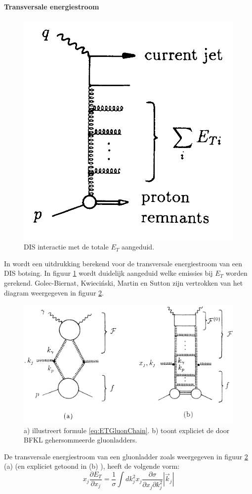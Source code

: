\documentclass[a4paper,11pt]{article}
\numberwithin{equation}{section} %
\begin{document}
      \paragraph{Transversale energiestroom}
\begin{figure} [H]
  \begin{center}
    \includegraphics[width=.33\textwidth]{Afbeeldingen/ETDefinitionDiagram.png}
    \caption{DIS interactie met de totale $E_T$ aangeduid. \cite{ET}}
   \label{fig:ETDefinitionDiagram}
  \end{center}
\end{figure}
In \cite{ET} wordt een uitdrukking berekend voor de transversale energiestroom van een DIS botsing.
In figuur \ref{fig:ETDefinitionDiagram} wordt duidelijk aangeduid welke emissies bij $E_T$ worden gerekend.
Golec-Biernat, Kwieciński, Martin en Sutton zijn vertrokken van het diagram weergegeven in figuur \ref{fig:ETDiagram}.
\begin{figure} [H]
  \begin{center}
    \includegraphics[width=.66\textwidth]{Afbeeldingen/ETDiagram.png}
    \caption{a) illustreert formule \eqref{eq:ETGluonChain}. b) toont expliciet de door BFKL gehersommeerde gluonladders. \cite{ET}}
   \label{fig:ETDiagram}
  \end{center}
\end{figure}
De transversale energiestroom van een gluonladder zoals weergegeven in figuur \ref{fig:ETDiagram} (a) (en expliciet getoond in (b) ), heeft de volgende vorm:
\begin{equation} \label{eq:ETGluonChain}
x_j \frac{\partial E_T}{\partial x_j} = \frac{1}{\sigma} \int dk_j^2 x_j \frac{\partial \sigma}{\partial x_j \partial k_j^2} |\vec{k}_j|
\end{equation}
\end{document}
